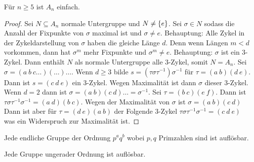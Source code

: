 \begin{Satz}
    Für \(n\geq 5\) ist \(A_n\) einfach.
\end{Satz}
\begin{proof}
    Sei \(N\subseteq A_n\) normale Untergruppe und \(N\neq\{e\}\).
    Sei \(\sigma\in N\) sodass die Anzahl der Fixpunkte von \(\sigma\) maximal ist und \(\sigma\neq e\).
    Behauptung: Alle Zykel in der Zykeldarstellung von \(\sigma\) haben die gleiche Länge \(d\). Denn wenn Längen \(m<d\) vorkommen, dann hat \(\sigma^m\) mehr Fixpunkte und \(\sigma^m\neq e\).
    Behauptung: \(\sigma\) ist ein 3-Zykel. Dann enthält \(N\) als normale Untergruppe alle \(3\)-Zykel, somit \(N=A_n\).
    Sei \(\sigma=(a\ b \ c\dots)(\dots)\dots\). 
    Wenn \(d\geq 3\) bilde \(s=(\tau \sigma\tau^{-1})\sigma^{-1}\) für \(\tau=(a\ b)(d\ e)\). Dann ist \(s=(c\ d\ e)\) ein 3-Zykel. Wegen Maximalität ist dann \(\sigma\) dieser 3-Zykel.
    Wenn \(d=2\) dann ist \(\sigma=(a\ b)(c \ d)\dots=\sigma^{-1}\).
    Sei \(\tau=(b\ c)(e\ f)\). Dann ist \(\tau\sigma\tau^{-1}\sigma^{-1}=(a\ d)(b\ c)\). Wegen der Maximalität von \(\sigma\) ist \(\sigma=(a\ b)(c\ d)\)
    Dann ist aber für \(\tau=(d\ e)(a\ b)\) der Folgende 3-Zykel \(\tau\sigma\tau^{-1}\sigma^{-1}=(c\ d\ e)\) was ein Widerspruch zur Maximalität ist.
\end{proof}
\begin{Satz}[Burnside 1911]
    Jede endliche Gruppe der Ordnung \(p^aq^b\) wobei \(p,q\) Primzahlen sind ist auflösbar.
\end{Satz}
\begin{Satz}
    Jede Gruppe ungerader Ordnung ist auflösbar.
\end{Satz}